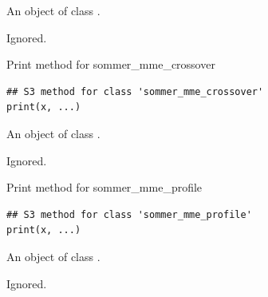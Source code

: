 \documentclass[a4paper]{book}
\begin{document}
%
\begin{Arguments}
\begin{ldescription}
\item[\code{x}] An object of class .

\item[\code{...}] Ignored.
\end{ldescription}
\end{Arguments}
%
\begin{Description}\relax
Print method for sommer\_mme\_crossover
\end{Description}
%
\begin{Usage}
\begin{verbatim}
## S3 method for class 'sommer_mme_crossover'
print(x, ...)
\end{verbatim}
\end{Usage}
%
\begin{Arguments}
\begin{ldescription}
\item[\code{x}] An object of class .

\item[\code{...}] Ignored.
\end{ldescription}
\end{Arguments}
%
\begin{Description}\relax
Print method for sommer\_mme\_profile
\end{Description}
%
\begin{Usage}
\begin{verbatim}
## S3 method for class 'sommer_mme_profile'
print(x, ...)
\end{verbatim}
\end{Usage}
%
\begin{Arguments}
\begin{ldescription}
\item[\code{x}] An object of class .

\item[\code{...}] Ignored.
\end{ldescription}
\end{Arguments}
\end{document}

